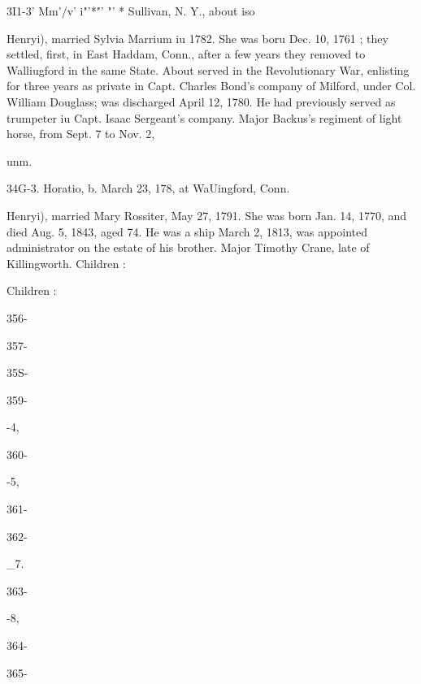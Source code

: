 \documentclass{book}
\begin{document}
3I1-3' Mm'/v' i"'*"' "' * Sullivan, N. Y., about iso 




Henryi), married Sylvia Marrium iu 1782. She was boru Dec. 
10, 1761 ; they settled, first, in East Haddam, Conn., after a few 
years they removed to Walliugford in the same State. About 
served in the Revolutionary War, enlisting for three years as 
private in Capt. Charles Bond's company of Milford, under Col. 
William Douglass; was discharged April 12, 1780. He had 
previously served as trumpeter iu Capt. Isaac Sergeant's company. 
Major Backus's regiment of light horse, from Sept. 7 to Nov. 2, 


unm. 


34G-3. Horatio, b. March 23, 178, at WaUingford, Conn. 









Henryi), married Mary Rossiter, May 27, 1791. She was born 
Jan. 14, 1770, and died Aug. 5, 1843, aged 74. He was a ship 
March 2, 1813, was appointed administrator on the estate of his 
brother. Major Timothy Crane, late of Killingworth. Children : 












Children : 









356- 




357- 




35S- 




359- 


-4, 


360- 


-5, 


361- 




362- 


\_7. 


363- 


-8, 


364- 




365- 
\end{document}
